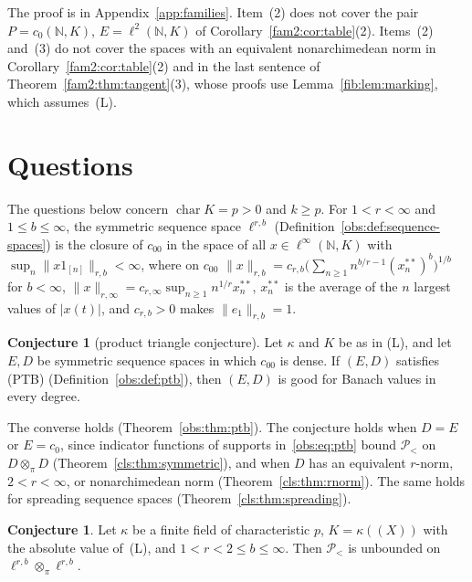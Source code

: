 \documentclass[11pt]{amsart}
\theoremstyle{definition}
\theoremstyle{remark}
\numberwithin{equation}{section}
\newcommand{\N}{\mathbb N}
\newcommand{\linf}{\ell^\infty}
\newcommand{\abs}[1]{\lvert #1\rvert}
\newcommand{\norm}[1]{\lVert #1\rVert}
\theoremstyle{plain}
\theoremstyle{definition}
\newtheorem{conjecture}[theorem]{Conjecture}
\theoremstyle{plain}
\newcommand{\cP}{\mathcal P}
\begin{document}
The proof is in Appendix~\ref{app:families}. Item~(2) does not cover the pair $P=c_0(\N,K)$, $E=\ell^2(\N,K)$ of
Corollary~\ref{fam2:cor:table}(2). Items~(2) and~(3) do not cover the spaces with an equivalent nonarchimedean norm in
Corollary~\ref{fam2:cor:table}(2) and in the last sentence of Theorem~\ref{fam2:thm:tangent}(3), whose proofs use
Lemma~\ref{fib:lem:marking}, which assumes~\textup{(L)}.
\section{Questions}\label{sec:questions}

The questions below concern $\operatorname{char}K=p>0$ and $k\ge p$. For $1<r<\infty$ and $1\le b\le\infty$, the
symmetric sequence space $\ell^{r,b}$ (Definition~\ref{obs:def:sequence-spaces}) is the closure of $c_{00}$ in the space
of all $x\in\linf(\N,K)$ with $\sup_n\norm{x1_{[n]}}_{r,b}<\infty$, where on $c_{00}$
$\norm x_{r,b}=c_{r,b}\bigl(\sum_{n\ge1}n^{b/r-1}(x^{**}_n)^b\bigr)^{1/b}$ for $b<\infty$,
$\norm x_{r,\infty}=c_{r,\infty}\sup_{n\ge1}n^{1/r}x^{**}_n$, $x^{**}_n$ is the average of the $n$ largest values of
$\abs{x(t)}$, and $c_{r,b}>0$ makes $\norm{e_1}_{r,b}=1$.

\begin{conjecture}[product triangle conjecture]\label{q:conj:pt}
Let $\kappa$ and $K$ be as in \textup{(L)}, and let $E,D$ be symmetric sequence spaces in which $c_{00}$ is dense. If $(E,D)$
satisfies \textup{(PTB)} (Definition~\ref{obs:def:ptb}), then $(E,D)$ is good for Banach values in every degree.
\end{conjecture}

The converse holds (Theorem~\ref{obs:thm:ptb}). The conjecture holds when $D=E$ or $E=c_0$, since indicator functions of
supports in~\eqref{obs:eq:ptb} bound $\cP_<$ on $D\otimes_\pi D$ (Theorem~\ref{cls:thm:symmetric}), and when $D$ has an
equivalent $r$\nobreakdash-norm, $2<r<\infty$, or nonarchimedean norm (Theorem~\ref{cls:thm:rnorm}). The same holds for
spreading sequence spaces (Theorem~\ref{cls:thm:spreading}).

\begin{conjecture}\label{q:conj:g}
Let $\kappa$ be a finite field of characteristic $p$, $K=\kappa((X))$ with the absolute value of~\textup{(L)}, and $1<r<2\le b\le\infty$. Then $\cP_<$ is unbounded on
$\ell^{r,b}\otimes_\pi\ell^{r,b}$.
\end{conjecture}
\end{document}
